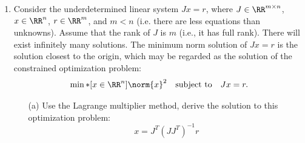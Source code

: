 \documentclass[11pt, oneside]{article}
\begin{document}
\begin{enumerate}
  \item %
    Consider the underdetermined linear system $Jx = r$, where
    $J \in \RR^{m \times n}$, $x \in \RR^n$, $r \in \RR^m$, and $m < n$
    (i.e. there are less equations than unknowns).
    Assume that the rank of $J$ is $m$ (i.e., it has full rank).
    There will exist infinitely many solutions.
    The minimum norm solution of $Jx = r$ is the solution closest to the origin,
    which may be regarded as the solution of the constrained optimization problem:
    \[
      \min*[x \in \RR^n]{\norm{x}^2} \quad \text{subject to} \quad Jx = r.
    \]
    \begin{enumerate}
      \item[(a)]
        Use the Lagrange multiplier method, derive the solution to this
        optimization problem:
        \[
          x = J^T (J J^T)^{-1} r
        \]


\end{enumerate}
\end{enumerate}
\end{document}
